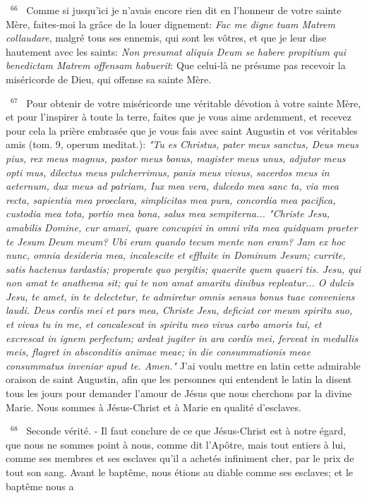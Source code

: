 \documentclass[paper=a5,pagesize=pdftex,fontsize=15pt,headinclude=on,twoside=off]{scrbook}
\newcommand{\negphantom}[1]{\settowidth{\dimen0}{#1}\hspace*{-\dimen0}}
\newcommand{\versenb}[1]{\par \vspace{10pt}~\negphantom{~${}^{#1}$~}${}^{#1}$~}
\newcommand{\latin}[1]{\emph{#1}}
\begin{document}
\versenb{66} Comme si jusqu'ici je n'avais encore rien dit en l'honneur de votre sainte Mère, faites-moi la grâce de la louer
dignement: \latin{Fac me digne tuam Matrem collaudare}, malgré tous ses ennemis, qui sont les vôtres, et que je leur
dise hautement avec les saints: \latin{Non presumat aliquis Deum se habere propitium qui benedictam Matrem offensam
habuerit}: Que celui-là ne présume pas recevoir la miséricorde de Dieu, qui offense sa sainte Mère.
\versenb{67} Pour obtenir de votre miséricorde une véritable dévotion à votre sainte Mère, et pour l'inspirer à toute la terre,
faites que je vous aime ardemment, et recevez pour cela la prière embrasée que je vous fais avec saint Augustin
et vos véritables amis (tom. 9, operum meditat.):
\latin{"Tu es Christus, pater meus sanctus, Deus meus pius, rex meus magnus, pastor meus bonus, magister meus
unus, adjutor meus opti mus, dilectus meus pulcherrimus, panis meus vivsus, sacerdos meus in aeternum, dux
meus ad patriam, Iux mea vera, dulcedo mea sanc ta, via mea recta, sapientia mea proeclara, simplicitas mea
pura, concordia mea pacifica, custodia mea tota, portio mea bona, salus mea sempiterna...
"Christe Jesu, amabilis Domine, cur amavi, quare concupivi in omni vita mea quidquam praeter te Jesum Deum
meum? Ubi eram quando tecum mente non eram? Jam ex hoc nunc, omnia desideria mea, incalescite et effluite in
Dominum Jesum; currite, satis hactenus tardastis; properate quo pergitis; quaerite quem quaeri tis. Jesu, qui non
amat te anathema sit; qui te non amat amaritu dinibus repleatur... O dulcis Jesu, te amet, in te delectetur, te
admiretur omnis sensus bonus tuae conveniens laudi. Deus cordis mei et pars mea, Christe Jesu, deficiat cor
meum spiritu suo, et vivas tu in me, et concalescat in spiritu meo vivus carbo amoris tui, et excrescat in ignem
perfectum; ardeat jugiter in ara cordis mei, ferveat in medullis meis, flagret in absconditis animae meae; in die
consummationis meae consummatus inveniar apud te. Amen."}
J'ai voulu mettre en latin cette admirable oraison de saint Augustin, afin que les personnes qui entendent le latin la
disent tous les jours pour demander l'amour de Jésus que nous cherchons par la divine Marie.
Nous sommes à Jésus-Christ et à Marie en qualité d'esclaves.
\versenb{68} Seconde vérité. - Il faut conclure de ce que Jésus-Christ est à notre égard, que nous ne sommes point à nous,
comme dit l'Apôtre, mais tout entiers à lui, comme ses membres et ses esclaves qu'il a achetés infiniment cher, par
le prix de tout son sang. Avant le baptême, nous étions au diable comme ses esclaves; et le baptême nous a
\end{document}
